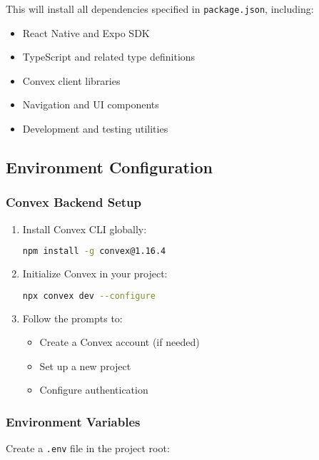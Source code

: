 \documentclass[11pt,a4paper]{article}
\begin{document}
This will install all dependencies specified in \texttt{package.json}, including:
\begin{itemize}
    \item React Native and Expo SDK
    \item TypeScript and related type definitions
    \item Convex client libraries
    \item Navigation and UI components
    \item Development and testing utilities
\end{itemize}

\subsection{Environment Configuration}

\subsubsection{Convex Backend Setup}

\begin{enumerate}
    \item Install Convex CLI globally:
    \begin{lstlisting}[language=bash]
npm install -g convex@1.16.4
    \end{lstlisting}
    
    \item Initialize Convex in your project:
    \begin{lstlisting}[language=bash]
npx convex dev --configure
    \end{lstlisting}
    
    \item Follow the prompts to:
    \begin{itemize}
        \item Create a Convex account (if needed)
        \item Set up a new project
        \item Configure authentication
    \end{itemize}
\end{enumerate}

\subsubsection{Environment Variables}

Create a \texttt{.env} file in the project root:
\end{document}
